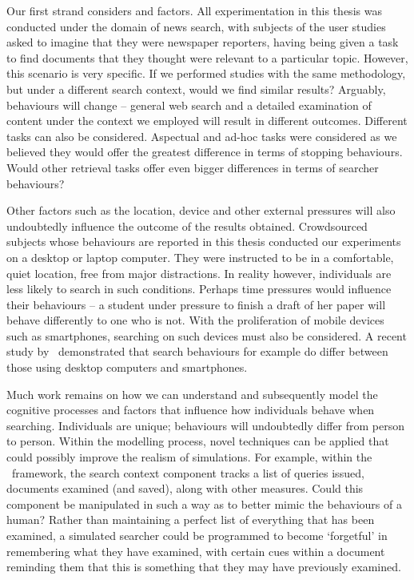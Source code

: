 Our first strand considers  and  factors. All experimentation in this thesis was conducted under the domain of news search, with subjects of the user studies asked to imagine that they were newspaper reporters, having being given a task to find documents that they thought were relevant to a particular topic. However, this scenario is very specific. If we performed studies with the same methodology, but under a different search context, would we find similar results? Arguably, behaviours will change -- general web search and a detailed examination of content under the context we employed will result in different outcomes. Different tasks can also be considered. Aspectual and ad-hoc tasks were considered as we believed they would offer the greatest difference in terms of stopping behaviours. Would other retrieval tasks offer even bigger differences in terms of searcher behaviours?

Other factors such as the location, device and other external pressures will also undoubtedly influence the outcome of the results obtained. Crowdsourced subjects whose behaviours are reported in this thesis conducted our experiments on a desktop or laptop computer. They were instructed to be in a comfortable, quiet location, free from major distractions. In reality however, individuals are less likely to search in such conditions. Perhaps time pressures would influence their behaviours -- a student under pressure to finish a draft of her paper will behave differently to one who is not. With the proliferation of mobile devices such as smartphones, searching on such devices must also be considered. A recent study by~\cite{ong2017scent_behaviour} demonstrated that search behaviours for example do differ between those using desktop computers and smartphones.

Much work remains on how we can understand and subsequently model the cognitive processes and factors that influence how individuals behave when searching. Individuals are unique; behaviours will undoubtedly differ from person to person. Within the modelling process, novel techniques can be applied that could possibly improve the realism of simulations. For example, within the \simiir~framework, the search context component tracks a list of queries issued, documents examined (and saved), along with other measures. Could this component be manipulated in such a way as to better mimic the behaviours of a human? Rather than maintaining a perfect list of everything that has been examined, a simulated searcher could be programmed to become `forgetful' in remembering what they have examined, with certain cues within a document reminding them that this is something that they may have previously examined.


